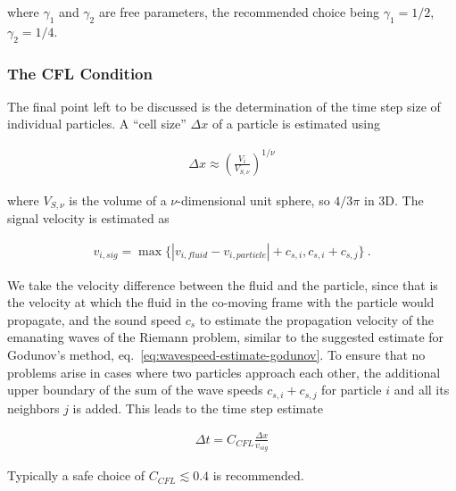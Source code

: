 where $\gamma_1$ and $\gamma_2$ are free parameters, the recommended choice being $\gamma_1 =
1/2$, $\gamma_2 = 1/4$.









\subsubsection{The CFL Condition}

The final point left to be discussed is the determination of the time step size of individual
particles. A ``cell size'' $\Delta x$ of  a particle is estimated using

\begin{align}
    \Delta x \approx \left(\frac{V_i}{V_{S,\nu}} \right)^{1/\nu}
\end{align}

where $V_{S,\nu}$ is the volume of a $\nu$-dimensional unit sphere, so $4/3 \pi$ in 3D. The signal
velocity is estimated as

\begin{align}
    v_{i,sig} = \max \{ |v_{i,fluid} - v_{i,particle}| + c_{s,i}, c_{s,i} + c_{s,j} \} \ .
\end{align}

We take the velocity difference between the fluid and the particle, since that is the velocity at
which the fluid in the co-moving frame with the particle would propagate, and the sound speed $c_s$
to estimate the propagation velocity of the emanating waves of the Riemann problem, similar to
the suggested estimate for Godunov's method, eq.~\ref{eq:wavespeed-estimate-godunov}. To ensure
that no problems arise in cases where two particles approach each other, the additional
upper boundary of the sum of the wave speeds $c_{s,i} + c_{s,j}$ for particle $i$ and all its
neighbors $j$ is added. This leads to the time step estimate

\begin{align}
    \Delta t = C_{CFL} \frac{\Delta x}{v_{sig}} \label{eq:meshless-cfl}
\end{align}

Typically a safe choice of $C_{CFL} \lesssim 0.4$ is recommended.








